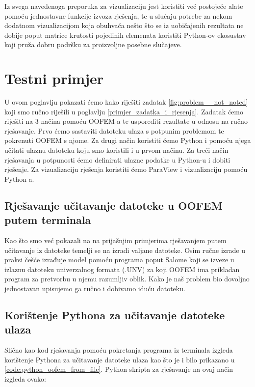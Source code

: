 \documentclass[a4paper,twoside,12pt]{memoir} %
\begin{document}
Iz svega navedenoga preporuka za vizualizaciju jest koristiti već postojeće alate pomoću jednostavne funkcije izvoza rješenja, te u slučaju potrebe za nekom dodatnom vizualizacijom koja obuhvaća nešto što se iz uobičajenih rezultata ne dobije poput matrice krutosti pojedinih elemenata koristiti Python-ov ekosustav koji pruža dobru podršku za proizvoljne posebne slučajeve.

\chapter{Testni primjer}
U ovom poglavlju pokazati ćemo kako riješiti zadatak \ref{fig:problem__not_noted} koji smo ručno riješili u poglavlju \ref{primjer_zadatka_i_rjesenja}. Zadatak ćemo riješiti na 3 načina pomoću OOFEM-a te usporediti rezultate u odnosu na ručno rješavanje. Prvo ćemo sastaviti datoteku ulaza s potpunim problemom te pokrenuti OOFEM s njome. Za drugi način koristiti ćemo Python i pomoću njega učitati ulaznu datoteku koju smo koristili i u prvom načinu. Za treći način rješavanja u potpunosti ćemo definirati ulazne podatke u Python-u i dobiti rješenje. Za vizualizaciju rješenja koristiti ćemo ParaView i vizualizaciju pomoću Python-a.

\section{Rješavanje učitavanje datoteke u OOFEM putem terminala}
Kao što smo već pokazali na na prijašnjim primjerima rješavanjem putem učitavanje iz datoteke temelji se na izradi valjane datoteke. Osim ručne izrade u praksi češće izrađuje model pomoću programa poput Salome koji se izveze u izlaznu datoteku univerzalnog formata (.UNV) za koji OOFEM ima prikladan program za pretvorbu u njemu razumljiv oblik. Kako je naš problem bio dovoljno jednostavan upisujemo ga ručno i dobivamo iduću datoteku.



\section{Korištenje Pythona za učitavanje datoteke ulaza}
Slično kao kod rješavanja pomoću pokretanja programa iz terminala izgleda korištenje Pythona za učitavanje datoteke ulaza kao što je i bilo prikazano u \ref{code:python_oofem_from_file}. Python skripta za rješavanje na ovaj način izgleda ovako: 
\end{document}
